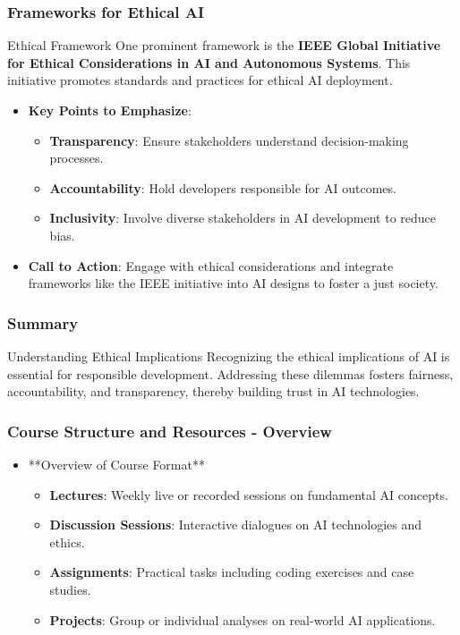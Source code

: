 \documentclass[aspectratio=169]{beamer}
\begin{document}
\begin{frame}[fragile]
    \frametitle{Frameworks for Ethical AI}
    \begin{block}{Ethical Framework}
        One prominent framework is the \textbf{IEEE Global Initiative for Ethical Considerations in AI and Autonomous Systems}. This initiative promotes standards and practices for ethical AI deployment.
    \end{block}
    
    \begin{itemize}
        \item \textbf{Key Points to Emphasize}:
        \begin{itemize}
            \item \textbf{Transparency}: Ensure stakeholders understand decision-making processes.
            \item \textbf{Accountability}: Hold developers responsible for AI outcomes.
            \item \textbf{Inclusivity}: Involve diverse stakeholders in AI development to reduce bias.
        \end{itemize}
        
        \item \textbf{Call to Action}:
        Engage with ethical considerations and integrate frameworks like the IEEE initiative into AI designs to foster a just society.
    \end{itemize}
\end{frame}

\begin{frame}[fragile]
    \frametitle{Summary}
    \begin{block}{Understanding Ethical Implications}
        Recognizing the ethical implications of AI is essential for responsible development. Addressing these dilemmas fosters fairness, accountability, and transparency, thereby building trust in AI technologies.
    \end{block}
\end{frame}

\begin{frame}[fragile]
    \frametitle{Course Structure and Resources - Overview}
    \begin{itemize}
        \item **Overview of Course Format**
        \begin{itemize}
            \item \textbf{Lectures}: Weekly live or recorded sessions on fundamental AI concepts.
            \item \textbf{Discussion Sessions}: Interactive dialogues on AI technologies and ethics.
            \item \textbf{Assignments}: Practical tasks including coding exercises and case studies.
            \item \textbf{Projects}: Group or individual analyses on real-world AI applications.
        \end{itemize}
    \end{itemize}
\end{frame}
\end{document}

